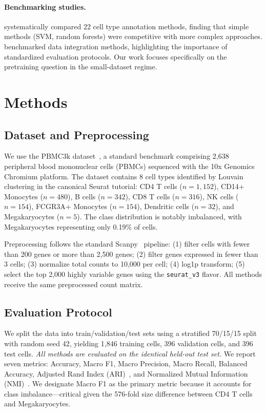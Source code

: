 \documentclass{article}
\begin{document}
\paragraph{Benchmarking studies.}
\citet{abdelaal2019comparison} systematically compared 22 cell type annotation methods,
finding that simple methods (SVM, random forests) were competitive with more complex
approaches. \citet{luecken2022benchmarking} benchmarked data integration methods,
highlighting the importance of standardized evaluation protocols. Our work focuses
specifically on the pretraining question in the small-dataset regime.

\section{Methods}
\label{sec:methods}

\subsection{Dataset and Preprocessing}
\label{sec:dataset}

We use the PBMC3k dataset~\citep{zheng2017massively}, a standard benchmark comprising
2,638 peripheral blood mononuclear cells (PBMCs) sequenced with the 10x Genomics Chromium
platform. The dataset contains 8 cell types identified by Louvain clustering in the
canonical Seurat tutorial: CD4 T cells ($n=1,152$), CD14+ Monocytes ($n=480$), B cells
($n=342$), CD8 T cells ($n=316$), NK cells ($n=154$), FCGR3A+ Monocytes ($n=154$),
Dendritic cells ($n=32$), and Megakaryocytes ($n=5$). The class distribution is notably
imbalanced, with Megakaryocytes representing only 0.19\% of cells.

Preprocessing follows the standard Scanpy~\citep{wolf2018scanpy} pipeline: (1) filter
cells with fewer than 200 genes or more than 2,500 genes; (2) filter genes expressed in
fewer than 3 cells; (3) normalize total counts to 10,000 per cell; (4) log1p transform;
(5) select the top 2,000 highly variable genes using the \texttt{seurat\_v3} flavor.
All methods receive the same preprocessed count matrix.

\subsection{Evaluation Protocol}
\label{sec:eval}

We split the data into train/validation/test sets using a stratified 70/15/15 split with
random seed 42, yielding 1,846 training cells, 396 validation cells, and 396 test cells.
\emph{All methods are evaluated on the identical held-out test set.} We report seven
metrics: Accuracy, Macro F1, Macro Precision, Macro Recall, Balanced Accuracy, Adjusted
Rand Index (ARI)~\citep{hubert1985comparing}, and Normalized Mutual Information
(NMI)~\citep{strehl2002cluster}. We designate Macro F1 as the primary metric because it
accounts for class imbalance---critical given the 576-fold size difference between CD4 T
cells and Megakaryocytes.
\end{document}
